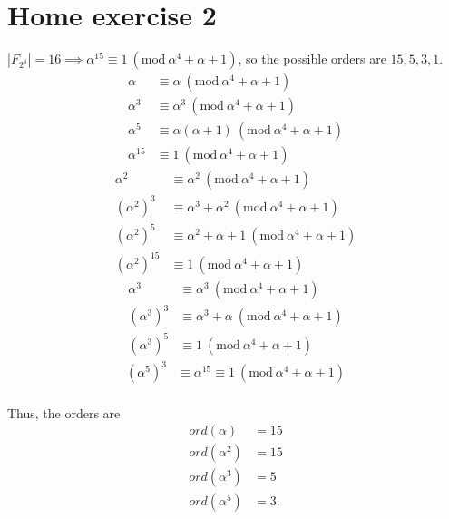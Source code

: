 \documentclass{article}
\theoremstyle{definition}
\theoremstyle{definition}
\theoremstyle{definition}
\newcommand{\Mod}[1]{\ (\mathrm{mod}\ #1)}
\begin{document}
\section{Home exercise 2}
$|F_{2^4}| = 16 \implies \alpha^{15} \equiv 1 \Mod{\alpha^4 + \alpha + 1}$, so the possible orders are $15, 5, 3, 1$.
\begin{align*}
\alpha &\equiv \alpha \Mod{\alpha^4 + \alpha + 1} \\
\alpha^3 &\equiv \alpha^3 \Mod{\alpha^4 + \alpha + 1} \\
\alpha^5 &\equiv \alpha(\alpha + 1) \Mod{\alpha^4 + \alpha + 1} \\
\alpha^{15} &\equiv 1 \Mod{\alpha^4 + \alpha + 1}
\end{align*}
\begin{align*}
\alpha^2 &\equiv \alpha^2 \Mod{\alpha^4 + \alpha + 1} \\
(\alpha^2)^3 &\equiv \alpha^3 + \alpha^2 \Mod{\alpha^4 + \alpha + 1} \\
(\alpha^2)^5 &\equiv \alpha^2 + \alpha + 1 \Mod{\alpha^4 + \alpha + 1} \\
(\alpha^2)^{15} &\equiv 1 \Mod{\alpha^4 + \alpha + 1}
\end{align*}
\begin{align*}
\alpha^3 &\equiv \alpha^3 \Mod{\alpha^4 + \alpha + 1} \\
(\alpha^3)^3 &\equiv \alpha^3 + \alpha \Mod{\alpha^4 + \alpha + 1} \\
(\alpha^3)^5 &\equiv 1 \Mod{\alpha^4 + \alpha + 1}
\end{align*}
\begin{align*}
(\alpha^5)^3 &\equiv \alpha^{15} \equiv 1 \Mod{\alpha^4 + \alpha + 1} \\
\end{align*}

Thus, the orders are
\begin{align*}
ord(\alpha) &= 15 \\
ord(\alpha^2) &= 15 \\
ord(\alpha^3) &= 5 \\
ord(\alpha^5) &= 3.
\end{align*}
\end{document}

